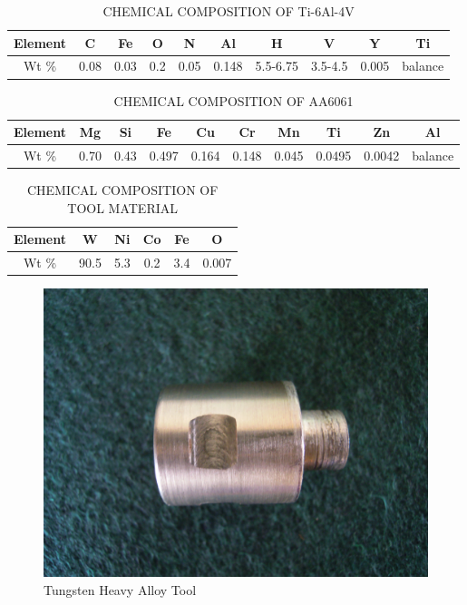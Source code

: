 \documentclass[preprint]{elsarticle}
\begin{document}
\begin{table}[!htbp]
\caption{CHEMICAL COMPOSITION OF Ti-6Al-4V}
\centering
\begin{tabular}{|c|c|c|c|c|c|c|c|c|c|}
\hline 
Element & C & Fe & O & N & Al & H & V & Y & Ti\\ 
\hline 
Wt \% & 0.08 & 0.03 & 0.2 & 0.05 & 0.148 & 5.5-6.75 & 3.5-4.5 & 0.005 & balance\\ 
\hline 
\end{tabular}
\label{table:Ti-6Al-4V-composition} %
\end{table}


\begin{table}[!htbp]
\caption{CHEMICAL COMPOSITION OF AA6061}
\centering
\begin{tabular}{|c|c|c|c|c|c|c|c|c|c|}
\hline 
Element & Mg & Si & Fe & Cu & Cr & Mn & Ti & Zn & Al\\ 
\hline 
Wt \% & 0.70 & 0.43 & 0.497 & 0.164 & 0.148 & 0.045 & 0.0495 & 0.0042 & balance\\ 
\hline 
\end{tabular}
\label{table:AA6061-composition} %
\end{table}

\begin{table}[!htbp]
\caption{CHEMICAL COMPOSITION OF TOOL MATERIAL}
\centering
\begin{tabular}{|c|c|c|c|c|c|}
\hline 
Element & W & Ni & Co & Fe & O \\ 
\hline 
Wt \% & 90.5 & 5.3 & 0.2 & 3.4 & 0.007 \\ 
\hline 
\end{tabular}
\label{table:tool-composition} %
\end{table}

\begin{figure}[H]
\centering
\includegraphics[width=\textwidth]{images/Tool.jpg}
\caption{Tungsten Heavy Alloy Tool}
\label{fig:tool}
\end{figure}
\end{document}
